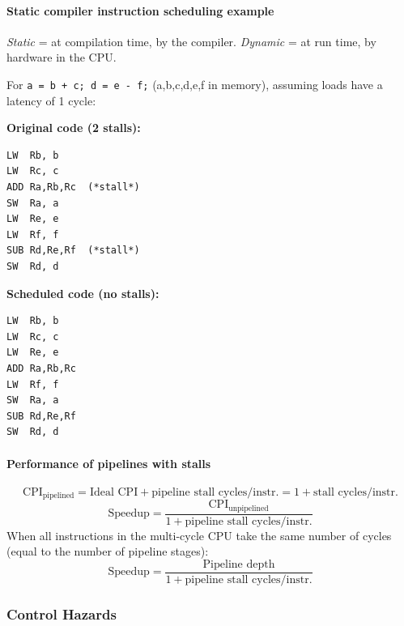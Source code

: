 \paragraph{Static compiler instruction scheduling example}

\begin{note}
\emph{Static} = at compilation time, by the compiler. \emph{Dynamic} = at
run time, by hardware in the CPU.
\end{note}

\begin{eg}[Scheduling \texttt{a = b + c; d = e - f;}]
For \texttt{a = b + c;\ d = e - f;} (a,b,c,d,e,f in memory), assuming loads
have a latency of 1 cycle:

\begin{center}
\begin{minipage}{0.46\linewidth}
\textbf{Original code (2 stalls):}
\begin{lstlisting}
LW  Rb, b
LW  Rc, c
ADD Ra,Rb,Rc  (*stall*)
SW  Ra, a
LW  Re, e
LW  Rf, f
SUB Rd,Re,Rf  (*stall*)
SW  Rd, d
\end{lstlisting}
\end{minipage}\hfill
\begin{minipage}{0.46\linewidth}
\textbf{Scheduled code (no stalls):}
\begin{lstlisting}
LW  Rb, b
LW  Rc, c
LW  Re, e
ADD Ra,Rb,Rc
LW  Rf, f
SW  Ra, a
SUB Rd,Re,Rf
SW  Rd, d
\end{lstlisting}
\end{minipage}
\end{center}

\end{eg}

\paragraph{Performance of pipelines with stalls}

\[
  \mathrm{CPI}_{\text{pipelined}} = \text{Ideal CPI} + \text{pipeline stall cycles/instr.} = 1 + \text{stall cycles/instr.}
\]
\[
  \text{Speedup} = \frac{\mathrm{CPI}_{\text{unpipelined}}}{1+\text{pipeline stall cycles/instr.}}
\]
When all instructions in the multi-cycle CPU take the same number of cycles
(equal to the number of pipeline stages):
\[
  \text{Speedup} = \frac{\text{Pipeline depth}}{1+\text{pipeline stall cycles/instr.}}
\]

\subsubsection{Control Hazards}
\label{sec:control-hazards}

